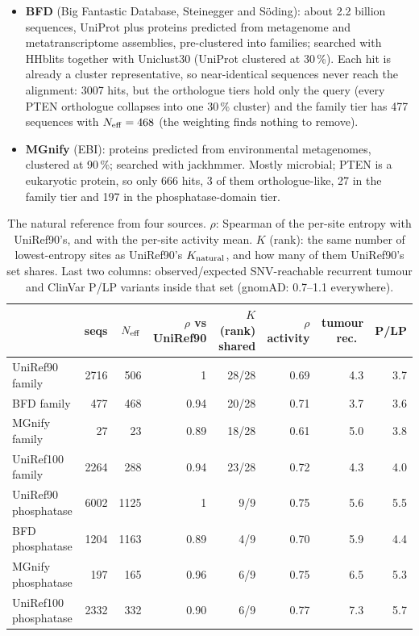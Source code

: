\documentclass[11pt,a4paper]{article}
\begin{document}
\begin{itemize}
\item \textbf{BFD} (Big Fantastic Database, Steinegger and S\"oding): about
  2.2 billion sequences, UniProt plus proteins predicted from metagenome and
  metatranscriptome assemblies, pre-clustered into families; searched with
  HHblits together with Uniclust30 (UniProt clustered at 30\,\%). Each hit is
  already a cluster representative, so near-identical sequences never reach
  the alignment: 3007 hits, but the orthologue tiers hold only the query
  (every PTEN orthologue collapses into one 30\,\% cluster) and the family
  tier has 477 sequences with $N_{\rm eff}=468$ (the weighting finds nothing
  to remove).
\item \textbf{MGnify} (EBI): proteins predicted from environmental metagenomes,
  clustered at 90\,\%; searched with jackhmmer. Mostly microbial; PTEN is a
  eukaryotic protein, so only 666 hits, 3 of them orthologue-like, 27 in the
  family tier and 197 in the phosphatase-domain tier.
\end{itemize}

\begin{table}[h]\centering\small
\setlength{\tabcolsep}{4pt}\begin{tabular}{lrrrrrrr}
\toprule
 & seqs & $N_{\rm eff}$ & $\rho$ vs UniRef90 & $K$ (rank) shared & $\rho$ activity & tumour rec.\ & P/LP\\
\midrule
UniRef90 family & 2716 & 506 & 1 & 28/28 & 0.69 & 4.3 & 3.7\\
BFD family & 477 & 468 & 0.94 & 20/28 & 0.71 & 3.7 & 3.6\\
MGnify family & 27 & 23 & 0.89 & 18/28 & 0.61 & 5.0 & 3.8\\
UniRef100 family & 2264 & 288 & 0.94 & 23/28 & 0.72 & 4.3 & 4.0\\
UniRef90 phosphatase & 6002 & 1125 & 1 & 9/9 & 0.75 & 5.6 & 5.5\\
BFD phosphatase & 1204 & 1163 & 0.89 & 4/9 & 0.70 & 5.9 & 4.4\\
MGnify phosphatase & 197 & 165 & 0.96 & 6/9 & 0.75 & 6.5 & 5.3\\
UniRef100 phosphatase & 2332 & 332 & 0.90 & 6/9 & 0.77 & 7.3 & 5.7\\
\bottomrule
\end{tabular}
\caption{The natural reference from four sources. $\rho$: Spearman of the
per-site entropy with UniRef90's, and with the per-site activity mean. $K$
(rank): the same number of lowest-entropy sites as UniRef90's $K_{\rm
natural}$, and how many of them UniRef90's set shares. Last two columns:
observed/expected SNV-reachable recurrent tumour and ClinVar P/LP variants
inside that set (gnomAD: 0.7--1.1 everywhere).}
\label{tab:msa}
\end{table}
\end{document}
